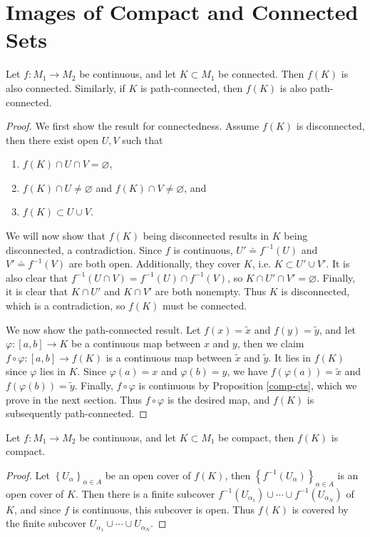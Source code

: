 \documentclass[10pt]{report}
\begin{document}

\section{Images of Compact and Connected Sets}

\begin{thrm}{}{}
	Let $f:M_1 \to M_2$ be continuous, and let $K\subset M_1$ be connected. Then $f(K)$ is also connected. Similarly, if $K$ is path-connected, then $f(K)$ is also path-connected.
\end{thrm}
\begin{proof}
	We first show the result for connectedness. Assume $f(K)$ is disconnected, then there exist open $U,V$ such that
	\begin{enumerate}
		\item $f(K) \cap U \cap V = \varnothing$,
		\item $f(K) \cap U \neq \varnothing$ and $f(K) \cap V \neq \varnothing$, and
		\item $f(K) \subset U \cup V$.
	\end{enumerate}
	We will now show that $f(K)$ being disconnected results in $K$ being disconnected, a contradiction. Since $f$ is continuous, $U' \doteq f^{-1}(U)$ and $V' \doteq f^{-1}(V)$ are both open. Additionally, they cover $K$, i.e. $K \subset U' \cup V'$. It is also clear that $f^{-1}(U\cap V) = f^{-1}(U) \cap f^{-1}(V)$, so $K \cap U' \cap V' = \varnothing$. Finally, it is clear that $K \cap U'$ and $K \cap V'$ are both nonempty. Thus $K$ is disconnected, which is a contradiction, so $f(K)$ must be connected.

	We now show the path-connected result. Let $f(x) = \tilde{x}$ and $f(y) = \tilde{y}$, and let $\varphi: [a,b] \to K$ be a continuous map between $x$ and $y$, then we claim $f \circ \varphi : [a,b] \to f(K)$ is a continuous map between $\tilde{x}$ and $\tilde{y}$. It lies in $f(K)$ since $\varphi$ lies in $K$. Since $\varphi(a)=x$ and $\varphi(b)=y$, we have $f(\varphi(a))=\tilde{x}$ and $f(\varphi(b))=\tilde{y}$. Finally, $f \circ \varphi$ is continuous by Proposition \ref{comp-cts}, which we prove in the next section. Thus $f\circ\varphi$ is the desired map, and $f(K)$ is subsequently path-connected.
\end{proof}

\begin{thrm}{}{}
	Let $f:M_1\to M_2$ be continuous, and let $K\subset M_1$ be compact, then $f(K)$ is compact.
\end{thrm}
\begin{proof}
	Let $\left\{ U_\alpha \right\}_{\alpha\in A}$ be an open cover of $f(K)$, then $\left\{ f^{-1}(U_\alpha) \right\}_{\alpha\in A}$ is an open cover of $K$. Then there is a finite subcover $f^{-1}(U_{\alpha_1}) \cup \cdots \cup f^{-1}(U_{\alpha_N})$ of $K$, and since $f$ is continuous, this subcover is open. Thus $f(K)$ is covered by the finite subcover $U_{\alpha_1} \cup \cdots \cup U_{\alpha_N}$.
\end{proof}
\end{document}
